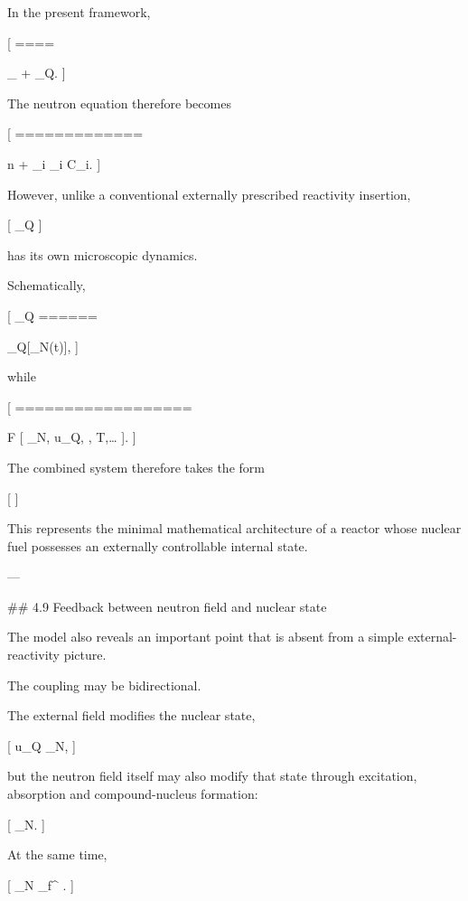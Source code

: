 In the present framework,

[
\rho
====

\rho_{}
+
\rho_Q.
]

The neutron equation therefore becomes

[
=============

n
+
\sum_i \lambda_i C_i.
]

However, unlike a conventional externally prescribed reactivity insertion,

[
\rho_Q
]

has its own microscopic dynamics.

Schematically,

[
\rho_Q
======

\rho_Q[\rho_N(t)],
]

while

[
==================

\mathcal F
[
\rho_N,
u_Q,
\Phi,
T,\ldots
].
]

The combined system therefore takes the form

[
]

This represents the minimal mathematical architecture of a reactor whose nuclear fuel possesses an externally controllable internal state.

---

## 4.9 Feedback between neutron field and nuclear state

The model also reveals an important point that is absent from a simple external-reactivity picture.

The coupling may be bidirectional.

The external field modifies the nuclear state,

[
u_Q
\rightarrow
\rho_N,
]

but the neutron field itself may also modify that state through excitation, absorption and compound-nucleus formation:

[
\Phi
\rightarrow
\rho_N.
]

At the same time,

[
\rho_N
\rightarrow
\sigma_f^{}
\rightarrow
\Phi.
]


